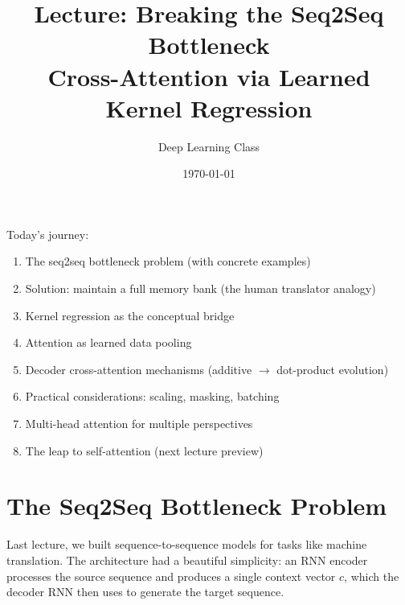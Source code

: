 \documentclass{article}
\title{Lecture: Breaking the Seq2Seq Bottleneck\\
\large Cross-Attention via Learned Kernel Regression}
\author{Deep Learning Class}
\date{\today}
\begin{document}
\maketitle

\begin{tcolorbox}[colback=blue!5!white, colframe=blue!75!black, title=Lecture Arc]
Today's journey:
\begin{enumerate}
    \item The seq2seq bottleneck problem (with concrete examples)
    \item Solution: maintain a full memory bank (the human translator analogy)
    \item Kernel regression as the conceptual bridge
    \item Attention as learned data pooling
    \item Decoder cross-attention mechanisms (additive $\rightarrow$ dot-product evolution)
    \item Practical considerations: scaling, masking, batching
    \item Multi-head attention for multiple perspectives
    \item The leap to self-attention (next lecture preview)
\end{enumerate}
\end{tcolorbox}

\section{The Seq2Seq Bottleneck Problem}

Last lecture, we built sequence-to-sequence models for tasks like machine translation. The architecture had a beautiful simplicity: an RNN encoder processes the source sequence and produces a single context vector $c$, which the decoder RNN then uses to generate the target sequence.
\end{document}
